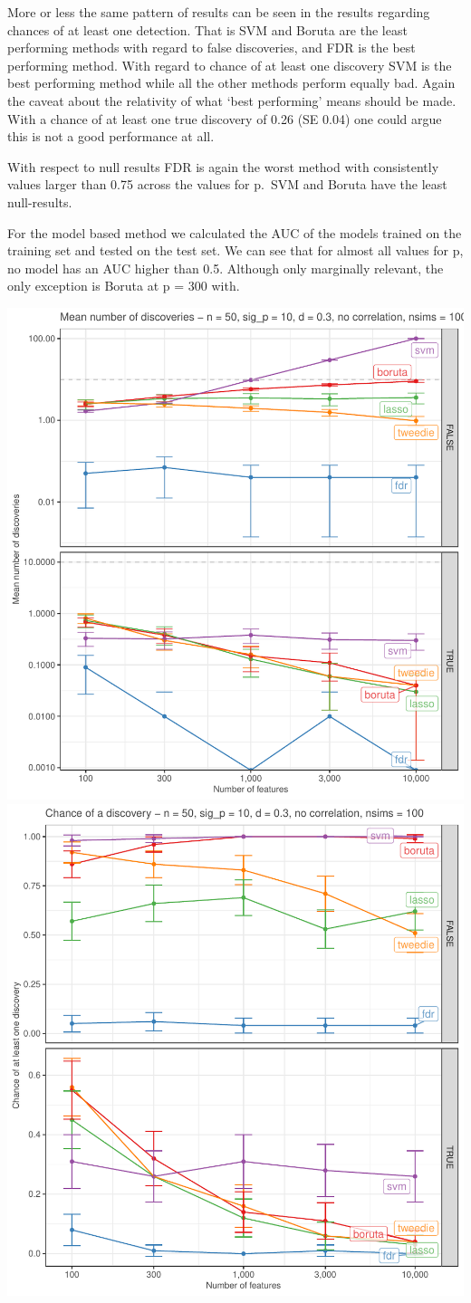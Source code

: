 \documentclass[
]{article}
\begin{document}
More or less the same pattern of results can be seen in the results regarding chances of at least one detection. That is SVM and Boruta are the least performing methods with regard to false discoveries, and FDR is the best performing method. With regard to chance of at least one discovery SVM is the best performing method while all the other methods perform equally bad. Again the caveat about the relativity of what `best performing' means should be made. With a chance of at least one true discovery of 0.26 (SE 0.04) one could argue this is not a good performance at all.

With respect to null results FDR is again the worst method with consistently values larger than 0.75 across the values for p.~SVM and Boruta have the least null-results.

For the model based method we calculated the AUC of the models trained on the training set and tested on the test set. We can see that for almost all values for p, no model has an AUC higher than 0.5. Although only marginally relevant, the only exception is Boruta at p = 300 with.

\begin{center}\includegraphics[width=0.49\linewidth]{main_files/figure-latex/unnamed-chunk-42-1} \includegraphics[width=0.49\linewidth]{main_files/figure-latex/unnamed-chunk-42-2} \end{center}
\end{document}
